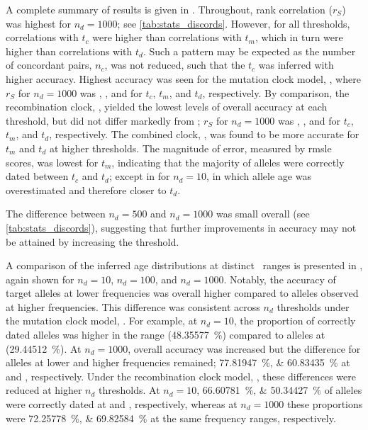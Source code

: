 %

%

A complete summary of results is given in .
Throughout, rank correlation ($r_S$) was highest for ${n_d = \num{1000}}$; see \cref{tab:stats_discords}.
However, for all thresholds, correlations with $t_c$ were higher than correlations with $t_m$, which in turn were higher than correlations with $t_d$.
Such a pattern may be expected as the number of concordant pairs, $n_c$, was not reduced, such that the $t_c$ was inferred with higher accuracy.
Highest accuracy was seen for the mutation clock model, \ClockM, where $r_S$ for ${n_d = \num{1000}}$ was , , and  for $t_c$, $t_m$, and $t_d$, respectively.
By comparison, the recombination clock, \ClockR, yielded the lowest levels of overall accuracy at each threshold, but did not differ markedly from \ClockM; \eg $r_S$ for ${n_d = \num{1000}}$ was , , and  for $t_c$, $t_m$, and $t_d$, respectively.
The combined clock, \ClockC, was found to be more accurate for $t_m$ and $t_d$ at higher thresholds.
The magnitude of error, measured by \gls{rmsle} scores, was lowest for $t_m$, indicating that the majority of alleles were correctly dated between $t_c$ and $t_d$; except in \ClockM for ${n_d = \num{10}}$, in which allele age was overestimated and therefore closer to $t_d$.

The difference between ${n_d = \num{500}}$ and ${n_d = \num{1000}}$ was small overall (see \cref{tab:stats_discords}), suggesting that further improvements in accuracy may not be attained by increasing the threshold.

%

%

A comparison of the inferred age distributions at distinct \fk{}~ranges is presented in , again shown for ${n_d = \num{10}}$, ${n_d = \num{100}}$, and ${n_d = \num{1000}}$.
Notably, the accuracy of target alleles at lower frequencies was overall higher compared to alleles observed at higher frequencies.
This difference was consistent across $n_d$ thresholds under the mutation clock model, \ClockM.
For example, at ${n_d = \num{10}}$, the proportion of correctly dated alleles was higher in the \fk{[2,5]} range (\SI{48.35577}{\percent}) compared to alleles at \fk{(5,10]} (\SI{29.44512}{\percent}).
At ${n_d = \num{1000}}$, overall accuracy was increased but the difference for alleles at lower and higher frequencies remained; \ie \SIlist{77.81947;60.83435}{\percent} at \fk{[2,5]} and \fk{(5,10]}, respectively.
Under the recombination clock model, \ClockR, these differences were reduced at higher $n_d$ thresholds.
At ${n_d = \num{10}}$, \SIlist{66.60781;50.34427}{\percent} of alleles were correctly dated at \fk{[2,5]} and \fk{(5,10]}, respectively, whereas at ${n_d = \num{1000}}$ these proportions were \SIlist{72.25778;69.82584}{\percent} at the same frequency ranges, respectively.

